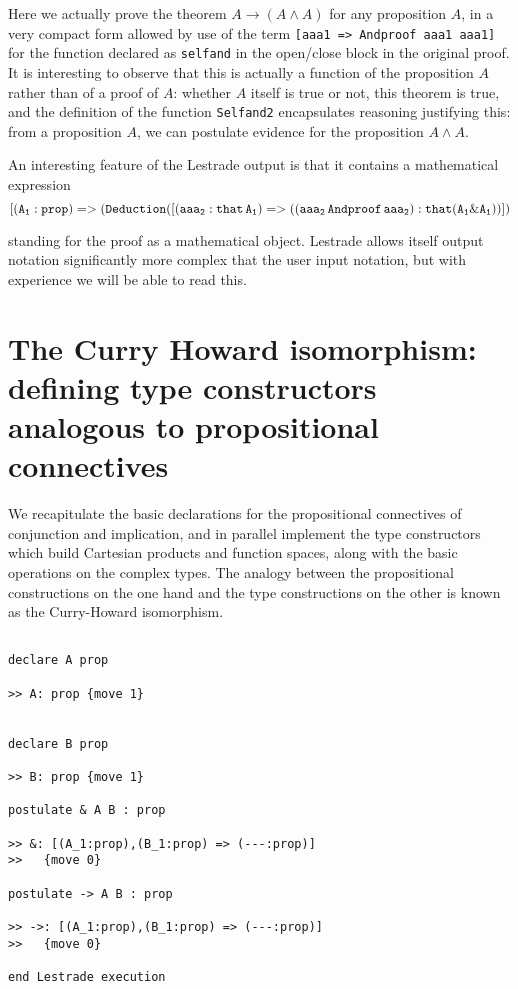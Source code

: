 \documentclass[12pt]{article}
\begin{document}
Here we actually prove the theorem $A \rightarrow (A \wedge A)$ for any proposition $A$, in a very compact form allowed by use of the term {\tt [aaa1 => Andproof aaa1 aaa1]} for the function declared as {\tt selfand} in the open/close block in the original proof.   It is interesting to observe that this is actually a function of the proposition $A$ rather than of a proof of $A$:  whether $A$ itself is true or not, this theorem is true, and the definition of the function {\tt Selfand2} encapsulates reasoning justifying this:  from a proposition $A$, we can postulate evidence for the proposition $A \wedge A$.

An interesting feature of the Lestrade output is that it contains a mathematical expression $${\tt [(A_1:prop) => (Deduction([(aaa_2: that \,A_1) => ((aaa_2 \,Andproof\, aaa_2): that (A_1 \& A_1))])}$$

standing for the proof as a mathematical object.  Lestrade allows itself output notation significantly more complex that the user input notation, but with experience we will be able to read this.

\newpage

\section{The Curry Howard isomorphism:  defining type constructors analogous to propositional connectives}

We recapitulate the basic declarations for the propositional connectives of conjunction and implication, and in parallel implement the type constructors which build Cartesian products and function spaces, along with the basic operations on the complex types.  The analogy between the propositional constructions on the one hand and the type constructions on the other is known as the Curry-Howard isomorphism.

  \begin{verbatim}

declare A prop

>> A: prop {move 1}


declare B prop

>> B: prop {move 1}

postulate & A B : prop

>> &: [(A_1:prop),(B_1:prop) => (---:prop)]
>>   {move 0}

postulate -> A B : prop

>> ->: [(A_1:prop),(B_1:prop) => (---:prop)]
>>   {move 0}

end Lestrade execution
\end{verbatim}
\end{document}
